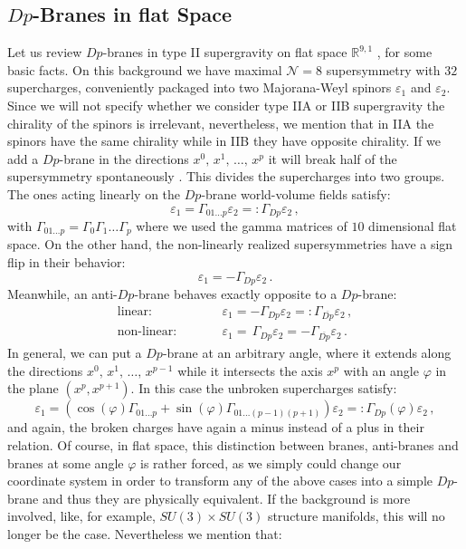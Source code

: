 \documentclass[a4paper,12pt,twoside,openright]{report}
\newcommand{\be}{\begin{equation}}
\newcommand{\ee}{\end{equation}}
\begin{document}
\subsection{$Dp$-Branes in flat Space}
\label{sec:flatspacebranes}
Let us review $Dp$-branes in type II supergravity on flat space $\mathbb{R}^{9,1}$ \cite{Polchinski:1998rr,Cederwall:1996pv,Aganagic:1996pe,Cederwall:1996ri,Bergshoeff:1996tu,Aganagic:1996nn}, for some basic facts. On this background we have maximal $\mathcal{N}=8$ supersymmetry with $32$ supercharges, conveniently packaged into two Majorana-Weyl spinors $\varepsilon_1$ and $\varepsilon_2$. Since we will not specify whether we consider type IIA or IIB supergravity the chirality of the spinors is irrelevant, nevertheless, we mention that in IIA the spinors have the same chirality while in IIB they have opposite chirality. If we add a $Dp$-brane in the directions $x^0,\,x^1,\,\ldots,\,x^p$ it will break half of the supersymmetry spontaneously \cite{Polchinski:1998rr}. This divides the supercharges into two groups. The ones acting linearly on the $Dp$-brane world-volume fields satisfy:
\be 
\varepsilon_1 = \Gamma_{01\ldots p} \varepsilon_2 =: \Gamma_{Dp}\varepsilon_2\,,
\ee
with $\Gamma_{01\ldots p} = \Gamma_0 \Gamma_1 \ldots \Gamma_p$ where we used the gamma matrices of $10$ dimensional flat space. On the other hand, the non-linearly realized supersymmetries have a sign flip in their behavior:
\be 
\varepsilon_1 = -\Gamma_{Dp}\varepsilon_2\,.
\ee
Meanwhile, an anti-$Dp$-brane behaves exactly opposite to a $Dp$-brane:
\be
\begin{matrix}
\text{linear:} & \qquad &\varepsilon_1 = - \Gamma_{Dp} \varepsilon_2 =: \Gamma_{\overline{Dp}} \varepsilon_2\,,\\
\text{non-linear:} & &\varepsilon_1 = \, \Gamma_{Dp} \varepsilon_2 = -\Gamma_{\overline{Dp}} \varepsilon_2\,.
\end{matrix}
\ee
In general, we can put a $Dp$-brane at an arbitrary angle, where it extends along the directions $x^0,\,x^1,\,\ldots ,\, x^{p-1}$ while it intersects the axis $x^p$ with an angle $\varphi$ in the plane $(x^p,x^{p+1})$. In this case the unbroken supercharges satisfy:
\be 
\varepsilon_1 = \left(\cos (\varphi) \Gamma_{01\ldots p} + \sin (\varphi) \Gamma_{01\ldots(p-1)(p+1)} \right)\varepsilon_2 =: \Gamma_{Dp}(\varphi) \varepsilon_2\,,
\ee
and again, the broken charges have again a minus instead of a plus in their relation. Of course, in flat space, this distinction between branes, anti-branes and branes at some angle $\varphi$ is rather forced, as we simply could change our coordinate system in order to transform any of the above cases into a simple $Dp$-brane and thus they are physically equivalent. If the background is more involved, like, for example,  $SU(3)\times SU(3)$ structure manifolds, this will no longer be the case. Nevertheless we mention that:
\end{document}
